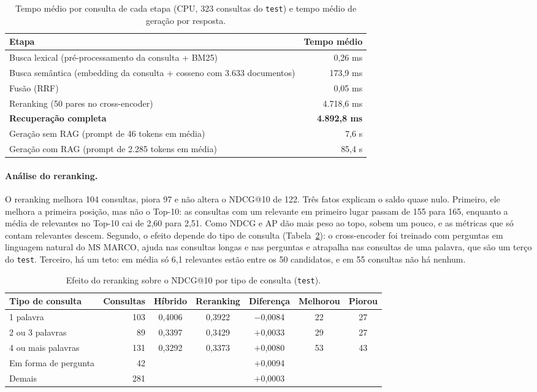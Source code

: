 \documentclass[11pt,a4paper]{article}
\newcommand{\cod}[1]{\texttt{#1}}
\begin{document}
\begin{table}[!htb]
\centering\small
\caption{Tempo médio por consulta de cada etapa (CPU, 323 consultas do \cod{test}) e tempo médio de geração por resposta.}
\label{tab:tempos}
\begin{tabular}{lr}
\toprule
Etapa & Tempo médio \\
\midrule
Busca lexical (pré-processamento da consulta + BM25) & 0,26 ms \\
Busca semântica (embedding da consulta + cosseno com 3.633 documentos) & 173,9 ms \\
Fusão (RRF) & 0,05 ms \\
Reranking (50 pares no cross-encoder) & 4.718,6 ms \\
\textbf{Recuperação completa} & \textbf{4.892,8 ms} \\
\midrule
Geração sem RAG (prompt de 46 tokens em média) & 7,6 s \\
Geração com RAG (prompt de 2.285 tokens em média) & 85,4 s \\
\bottomrule
\end{tabular}
\end{table}

\paragraph{Análise do reranking.} O reranking melhora 104 consultas, piora 97 e não altera o NDCG@10 de 122. Três fatos explicam o saldo quase nulo. Primeiro, ele melhora a primeira posição, mas não o Top-10: as consultas com um relevante em primeiro lugar passam de 155 para 165, enquanto a média de relevantes no Top-10 cai de 2,60 para 2,51. Como NDCG e AP dão mais peso ao topo, sobem um pouco, e as métricas que só contam relevantes descem. Segundo, o efeito depende do tipo de consulta (Tabela~\ref{tab:cetipo}): o cross-encoder foi treinado com perguntas em linguagem natural do MS MARCO, ajuda nas consultas longas e nas perguntas e atrapalha nas consultas de uma palavra, que são um terço do \cod{test}. Terceiro, há um teto: em média só 6,1 relevantes estão entre os 50 candidatos, e em 55 consultas não há nenhum.

\begin{table}[!htb]
\centering\small
\caption{Efeito do reranking sobre o NDCG@10 por tipo de consulta (\cod{test}).}
\label{tab:cetipo}
\begin{tabular}{lrccccc}
\toprule
Tipo de consulta & Consultas & Híbrido & Reranking & Diferença & Melhorou & Piorou \\
\midrule
1 palavra & 103 & 0,4006 & 0,3922 & $-$0,0084 & 22 & 27 \\
2 ou 3 palavras & 89 & 0,3397 & 0,3429 & $+$0,0033 & 29 & 27 \\
4 ou mais palavras & 131 & 0,3292 & 0,3373 & $+$0,0080 & 53 & 43 \\
\midrule
Em forma de pergunta & 42 & & & $+$0,0094 & & \\
Demais & 281 & & & $+$0,0003 & & \\
\bottomrule
\end{tabular}
\end{table}
\end{document}
